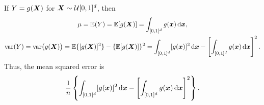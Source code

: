 \documentclass[letterpaper]{amsart}
\begin{document}
If $Y = g(\vX)$ for $\vX \sim \cu[0,1]^d$, then
\begin{gather*}
    \mu = \Ex(Y) = \Ex[g(\vX)]  = \int_{[0,1]^d} g(\vx) \, \dif \vx, \\
    \var(Y) = \var\bigl(g(\vX)\bigr) = \Ex\{[g(\vX)]^2\} - \{\Ex[g(\vX)]\}^2 = \int_{[0,1]^d} [g(\vx)]^2  \, \dif \vx -
    \left[\int_{[0,1]^d} g(\vx) \, \dif \vx\right]^2.
\end{gather*}
Thus, the mean squared error is
\[
\frac 1n  \left\{\int_{[0,1]^d} [g(\vx)]^2  \, \dif \vx -
    \left[\int_{[0,1]^d} g(\vx) \, \dif \vx\right]^2 \right\}.
\]
\end{document}
